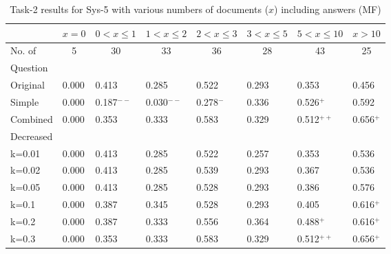 \begin{table}[t]
  \begin{center}
    \caption{Task-2 results for Sys-5 with various numbers of documents ($x$) including answers (MF)}
    \begin{tabular}{|l@{ }|l@{ }|l@{ }|l@{ }|l@{ }|l@{ }|l@{ }|l@{ }|} \hline
         &  \multicolumn{1}{c|}{$x=0$}        &  \multicolumn{1}{c|}{$0<x\leq1$}        & \multicolumn{1}{c|}{$1<x\leq2$}        & \multicolumn{1}{c|}{$2<x\leq3$}        & \multicolumn{1}{c|}{$3<x\leq5$}        & \multicolumn{1}{c|}{$5<x\leq10$}        & \multicolumn{1}{c|}{$x>10$}        \\\hline
No. of & \multicolumn{1}{c|}{5}            & \multicolumn{1}{c|}{30}           & \multicolumn{1}{c|}{33}           & \multicolumn{1}{c|}{36}           & \multicolumn{1}{c|}{28}           & \multicolumn{1}{c|}{43}           & \multicolumn{1}{c|}{25}\\[-0.1cm]
Question  &  & & & & & & \\\hline
Original          & 0.000        & 0.413        & 0.285        & 0.522        & 0.293        & 0.353        & 0.456\\\hline
Simple            & 0.000        & 0.187$^{--}$ & 0.030$^{--}$ & 0.278$^{-}$  & 0.336        & 0.526$^{+}$  & 0.592\\\hline
Combined          & 0.000        & 0.353        & 0.333        & 0.583        & 0.329        & 0.512$^{++}$ & 0.656$^{+}$\\\hline
Decreased         &              &              &              &              &              &              &      \\
k=0.01            & 0.000        & 0.413        & 0.285        & 0.522        & 0.257        & 0.353        & 0.536\\
k=0.02            & 0.000        & 0.413        & 0.285        & 0.539        & 0.293        & 0.367        & 0.536\\
k=0.05            & 0.000        & 0.413        & 0.285        & 0.528        & 0.293        & 0.386        & 0.576\\
k=0.1             & 0.000        & 0.387        & 0.345        & 0.528        & 0.293        & 0.405        & 0.616$^{+}$\\
k=0.2             & 0.000        & 0.387        & 0.333        & 0.556        & 0.364        & 0.488$^{+}$  & 0.616$^{+}$\\
k=0.3             & 0.000        & 0.353        & 0.333        & 0.583        & 0.329        & 0.512$^{++}$ & 0.656$^{+}$\\

\end{tabular}
\end{center}
\end{table}
